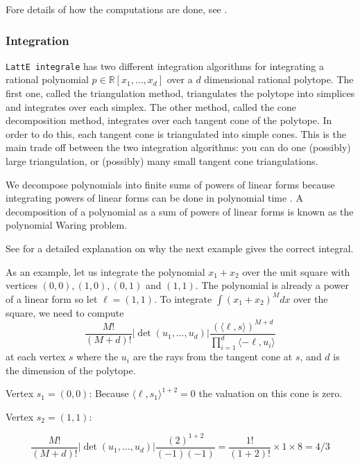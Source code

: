 \documentclass{article}
\newcommand{\R}{{\mathbb R}}
\newcommand{\latteInt}{{\tt LattE integrale}\xspace}
\begin{document}
Fore details of how the computations are done, see \cite{koeppe:irrational-barvinok, latte1} .

\subsubsection{Integration}

\latteInt has two different integration algorithms for integrating a rational polynomial $p \in \R[x_1, \dots, x_d]$ over a $d$ dimensional rational polytope. The first one, called the triangulation method, triangulates the polytope into simplices and integrates over each simplex. The other method, called the cone decomposition method, integrates over each tangent cone of the polytope. In order to do this, each tangent cone is triangulated into simple cones. This is the main trade off between the two integration algorithms: you can do one (possibly) large triangulation, or (possibly) many small tangent cone triangulations. 

We decompose polynomials into finite sums of powers of linear forms because integrating powers of linear forms can be done in polynomial time \cite{howToIntegratePolynomialSimplex}. A decomposition of a polynomial as a sum of powers of linear forms is known as the polynomial Waring problem.

See \cite{latte-integrale-paper} for a detailed explanation on why the next example gives the correct integral. 

As an example, let us integrate the polynomial $x_1+x_2$ over the unit square with vertices $(0,0), (1,0), (0,1)$ and $(1,1)$. The polynomial is already a power of a linear form so let $\ell = (1,1)$. To integrate $\int (x_1+x_2)^M dx$ over the square, we need to compute
\begin{displaymath}
	\frac{M!}{(M+d)!} |\det(u_1, \dots, u_d)| \frac{(\langle \ell, s \rangle)^{M+d}}{\prod_{i=1}^d  \langle -\ell, u_i \rangle}
\end{displaymath}
at each vertex $s$ where the $u_i$ are the rays from the tangent cone at $s$, and $d$ is the dimension of the polytope.

Vertex $s_1 = (0,0)$: Because $\langle \ell, s_1 \rangle ^{1+2} = 0$ the valuation on this cone is zero.

Vertex $s_2 = (1,1)$: 

\begin{displaymath}
 \frac{M!}{(M+d)!} |\det(u_1, \dots, u_d)| \frac{(2)^{1+2}}{(-1)(-1)} = \frac{1!}{(1+2)!} \times 1 \times 8 = 4/3
\end{displaymath}
\end{document}
